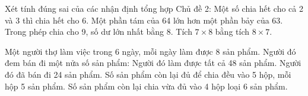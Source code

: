 \begin{ex} %
Xét tính đúng sai của các nhận định tổng hợp Chủ đề 2:
\choiceTF
{\True Một số chia hết cho cả 2 và 3 thì chia hết cho 6.}
{Một phần tám của 64 lớn hơn một phần bảy của 63.}
{\True Trong phép chia cho 9, số dư lớn nhất bằng 8.}
{\True Tích $7 \times 8$ bằng tích $8 \times 7$.}
\end{ex}

\begin{ex} %
Một người thợ làm việc trong 6 ngày, mỗi ngày làm được 8 sản phẩm. Người đó đem bán đi một nửa số sản phẩm:
\choiceTF
{\True Người đó làm được tất cả 48 sản phẩm.}
{\True Người đó đã bán đi 24 sản phẩm.}
{Số sản phẩm còn lại đủ để chia đều vào 5 hộp, mỗi hộp 5 sản phẩm.}
{\True Số sản phẩm còn lại chia vừa đủ vào 4 hộp loại 6 sản phẩm.}
\end{ex}

